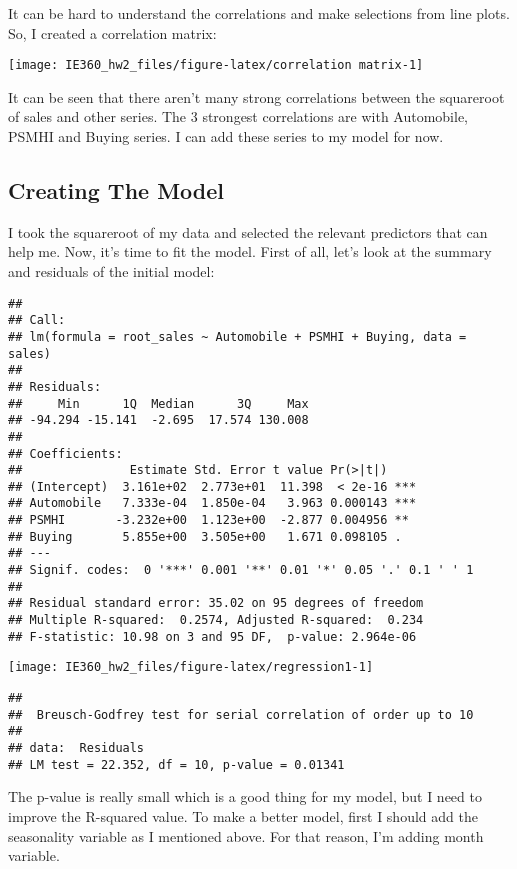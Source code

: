 \documentclass[
]{article}
\begin{document}
It can be hard to understand the correlations and make selections from
line plots. So, I created a correlation matrix:

\begin{center}\texttt{[image: IE360\_hw2\_files/figure-latex/correlation matrix-1]} \end{center}

It can be seen that there aren't many strong correlations between the
squareroot of sales and other series. The 3 strongest correlations are
with Automobile, PSMHI and Buying series. I can add these series to my
model for now.

\hypertarget{creating-the-model}{%
\subsection{Creating The Model}\label{creating-the-model}}

I took the squareroot of my data and selected the relevant predictors
that can help me. Now, it's time to fit the model. First of all, let's
look at the summary and residuals of the initial model:

\begin{verbatim}
## 
## Call:
## lm(formula = root_sales ~ Automobile + PSMHI + Buying, data = sales)
## 
## Residuals:
##     Min      1Q  Median      3Q     Max 
## -94.294 -15.141  -2.695  17.574 130.008 
## 
## Coefficients:
##               Estimate Std. Error t value Pr(>|t|)    
## (Intercept)  3.161e+02  2.773e+01  11.398  < 2e-16 ***
## Automobile   7.333e-04  1.850e-04   3.963 0.000143 ***
## PSMHI       -3.232e+00  1.123e+00  -2.877 0.004956 ** 
## Buying       5.855e+00  3.505e+00   1.671 0.098105 .  
## ---
## Signif. codes:  0 '***' 0.001 '**' 0.01 '*' 0.05 '.' 0.1 ' ' 1
## 
## Residual standard error: 35.02 on 95 degrees of freedom
## Multiple R-squared:  0.2574, Adjusted R-squared:  0.234 
## F-statistic: 10.98 on 3 and 95 DF,  p-value: 2.964e-06
\end{verbatim}

\begin{center}\texttt{[image: IE360\_hw2\_files/figure-latex/regression1-1]} \end{center}

\begin{verbatim}
## 
##  Breusch-Godfrey test for serial correlation of order up to 10
## 
## data:  Residuals
## LM test = 22.352, df = 10, p-value = 0.01341
\end{verbatim}

The p-value is really small which is a good thing for my model, but I
need to improve the R-squared value. To make a better model, first I
should add the seasonality variable as I mentioned above. For that
reason, I'm adding month variable.
\end{document}
